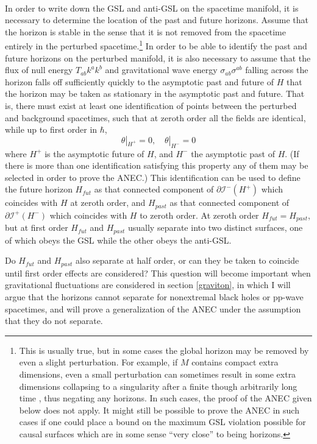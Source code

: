 \documentclass[11pt]{article}
\begin{document}
\paragraph{}
In order to write down the GSL and anti-GSL on the spacetime manifold, it is necessary to determine the location of the past and future horizons.  Assume that the horizon is stable in the sense that it is not removed from the spacetime entirely in the perturbed spacetime.\footnote{This is usually true, but in some cases the global horizon may be removed by even a slight perturbation.  For example, if $M$ contains compact extra dimensions, even a small perturbation can sometimes result in some extra dimensions collapsing to a singularity after a finite though arbitrarily long time \cite{penrose03}, thus negating any horizons.  In such cases, the proof of the ANEC given below does not apply.  It might still be possible to prove the ANEC in such cases if one could place a bound on the maximum GSL violation possible for causal surfaces which are in some sense ``very close'' to being horizons.}  In order to be able to identify the past and future horizons on the perturbed manifold, it is also necessary to assume that the flux of null energy $T_{ab} k^a k^b$ and gravitational wave energy $\sigma_{ab}\sigma^{ab}$ falling across the horizon falls off sufficiently quickly to the asymptotic past and future of $H$ that the horizon may be taken as stationary in the asymptotic past and future.  That is, there must exist at least one identification of points between the perturbed and background spacetimes, such that at zeroth order all the fields are identical, while up to first order in $\hbar$,
\begin{equation}\label{bound}
\theta |_{H^+} = 0,\quad \theta |_{H^-} = 0
\end{equation}
where $H^+$ is the asymptotic future of $H$, and $H^-$ the asymptotic past of $H$.  (If there is more than one identification satisfying this property any of them may be selected in order to prove the ANEC.)  This identification can be used to define the future horizon $H_{fut}$ as that connected component of $\partial \mathcal{I}^-(H^+)$ which coincides with $H$ at zeroth order, and $H_{past}$ as that connected component of $\partial \mathcal{I}^+(H^-)$ which coincides with $H$ to zeroth order.  At zeroth order $H_{fut} = H_{past}$, but at first order $H_{fut}$ and $H_{past}$ usually separate into two distinct surfaces, one of which obeys the GSL while the other obeys the anti-GSL.

Do $H_{fut}$ and $H_{past}$ also separate at half order, or can they be taken to coincide until first order effects are considered?  This question will become important when gravitational fluctuations are considered in section \ref{graviton}, in which I will argue that the horizons cannot separate for nonextremal black holes or pp-wave spacetimes, and will prove a generalization of the ANEC under the assumption that they do not separate.
\end{document}

